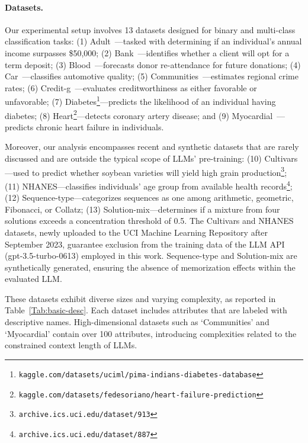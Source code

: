 \paragraph{Datasets.}
Our experimental setup involves 13 datasets designed for binary and multi-class classification tasks: (1) Adult~\cite{asuncion2007uci}—tasked with determining if an individual’s annual income surpasses \$50,000; (2) Bank~\cite{moro2014data}—identifies whether a client will opt for a term deposit; (3) Blood~\cite{yeh2009knowledge}—forecasts donor re-attendance for future donations; (4) Car~\cite{kadra2021well}—classifies automotive quality; (5) Communities~\cite{misc_communities_and_crime_183}—estimates regional crime rates; (6) Credit-g~\cite{kadra2021well}—evaluates creditworthiness as either favorable or unfavorable; (7) Diabetes\footnote{\texttt{kaggle.com/datasets/uciml/pima-indians-diabetes-database}}—predicts the likelihood of an individual having diabetes; (8) Heart\footnote{\texttt{kaggle.com/datasets/fedesoriano/heart-failure-prediction}}—detects coronary artery disease; and (9) Myocardial~\cite{misc_myocardial_infarction_complications_579}—predicts chronic heart failure in individuals.

Moreover, our analysis encompasses recent and synthetic datasets that are rarely discussed and are outside the typical scope of LLMs’ pre-training: (10) Cultivars—used to predict whether soybean varieties will yield high grain production\footnote{\texttt{archive.ics.uci.edu/dataset/913}}; (11) NHANES—classifies individuals’ age group from available health records\footnote{\texttt{archive.ics.uci.edu/dataset/887}}; (12) Sequence-type—categorizes sequences as one among arithmetic, geometric, Fibonacci, or Collatz; (13) Solution-mix—determines if a mixture from four solutions exceeds a concentration threshold of 0.5. The Cultivars and NHANES datasets, newly uploaded to the UCI Machine Learning Repository after September 2023, guarantee exclusion from the training data of the LLM API (gpt-3.5-turbo-0613) employed in this work. Sequence-type and Solution-mix are synthetically generated, ensuring the absence of memorization effects within the evaluated LLM.

These datasets exhibit diverse sizes and varying complexity, as reported in Table~\ref{Tab:basic-desc}.
Each dataset includes attributes that are labeled with descriptive names. High-dimensional datasets such as `Communities' and `Myocardial' contain over 100 attributes, introducing complexities related to the constrained context length of LLMs.

